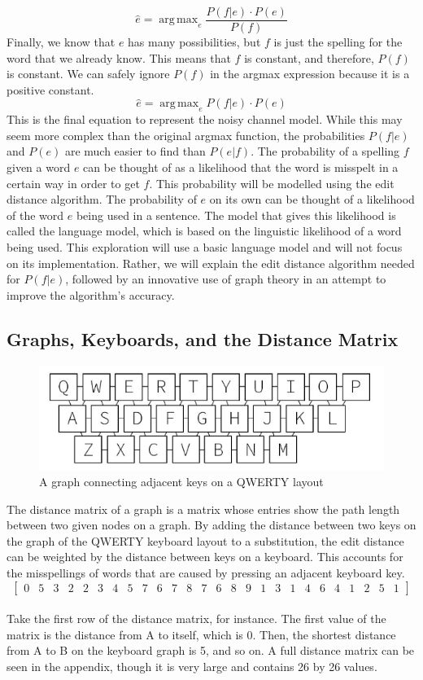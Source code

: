 \documentclass[12pt]{article}
\numberwithin{equation}{section}
\DeclareMathOperator*{\argmax}{arg\,max}
\begin{document}
\begin{equation} \hat{e}=\argmax_e{\frac{P(f|e)\cdot{P(e)}}{P(f)}} \end{equation}
Finally, we know that $e$ has many possibilities, but $f$ is just the spelling for the word that we already know. This means that $f$ is constant, and therefore, $P(f)$ is constant. We can safely ignore $P(f)$ in the argmax expression because it is a positive constant.
\begin{equation} \hat{e}=\argmax_e{P(f|e)\cdot{P(e)}} \end{equation}
This is the final equation to represent the noisy channel model. While this may seem more complex than the original argmax function, the probabilities $P(f|e)$ and $P(e)$ are much easier to find than $P(e|f)$. The probability of a spelling $f$ given a word $e$ can be thought of as a likelihood that the word is misspelt in a certain way in order to get $f$. This probability will be modelled using the edit distance algorithm. The probability of $e$ on its own can be thought of a likelihood of the word $e$ being used in a sentence. The model that gives this likelihood is called the language model, which is based on the linguistic likelihood of a word being used. This exploration will use a basic language model and will not focus on its implementation. Rather, we will explain the edit distance algorithm needed for $P(f|e)$, followed by an innovative use of graph theory in an attempt to improve the algorithm's accuracy.

\subsection{Graphs, Keyboards, and the Distance Matrix}
\begin{figure}[h]
    \centering
    \includegraphics[width=0.8\columnwidth]{kg.png}
    \caption{A graph connecting adjacent keys on a QWERTY layout}
\end{figure}
The distance matrix of a graph is a matrix whose entries show the path length between two given nodes on a graph. By adding the distance between two keys on the graph of the QWERTY keyboard layout to a substitution, the edit distance can be weighted by the distance between keys on a keyboard. This accounts for the misspellings of words that are caused by pressing an adjacent keyboard key.
\setcounter{MaxMatrixCols}{26}
\[ 
\begin{bmatrix}
0 & 5 & 3 & 2 & 2 & 3 & 4 & 5 & 7 & 6 & 7 & 8 & 7 & 6 & 8 & 9 & 1 & 3 & 1 & 4 & 6 & 4 & 1 & 2 & 5 & 1
\end{bmatrix}
\]
\\
Take the first row of the distance matrix, for instance. The first value of the matrix is the distance from A to itself, which is 0. Then, the shortest distance from A to B on the keyboard graph is 5, and so on. A full distance matrix can be seen in the appendix, though it is very large and contains 26 by 26 values.
\end{document}
